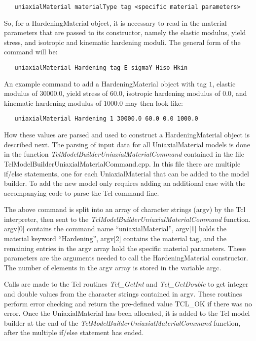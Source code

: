 \documentclass[12pt]{article}
\begin{document}
{\sf\small
\begin{verbatim}
   uniaxialMaterial materialType tag <specific material parameters>
\end{verbatim}
}

\noindent So, for a HardeningMaterial object, it is necessary to read in the material
parameters that are passed to its constructor, namely the elastic modulus, yield stress,
and isotropic and kinematic hardening moduli. The general form of the command will be:

{\sf\small
\begin{verbatim}
   uniaxialMaterial Hardening tag E sigmaY Hiso Hkin
\end{verbatim}
}

An example command to add a HardeningMaterial object with tag $1$, elastic modulus
of $30000.0$, yield stress of $60.0$, isotropic hardening modulus of $0.0$, and
kinematic hardening modulus of $1000.0$ may then look like:

{\sf\small
\begin{verbatim}
   uniaxialMaterial Hardening 1 30000.0 60.0 0.0 1000.0
\end{verbatim}
}

How these values are parsed and used to construct a HardeningMaterial object is
described next. The parsing of input data for all UniaxialMaterial models is done
in the function {\em TclModelBuilderUniaxialMaterialCommand} contained in the file
TclModelBuilderUniaxialMaterialCommand.cpp.
In this file there are multiple if/else statements, one for each UniaxialMaterial that
can be added to the model builder. To add the new model only requires adding an
additional case with the accompanying code to parse the Tcl command line.

The above command is split into an array of character strings (argv) by the Tcl
interpreter, then sent to the {\em TclModelBuilderUniaxialMaterialCommand} function.
argv[0] contains the command name ``uniaxialMaterial'', argv[1] holds the material keyword
``Hardening'', argv[2] contains the material tag, and the remaining entries in the
argv array hold the specific material parameters. These parameters are the arguments
needed to call the HardeningMaterial constructor. The number of elements in the argv
array is stored in the variable argc.

Calls are made to the Tcl routines {\em Tcl\_GetInt} and {\em Tcl\_GetDouble} to get
integer and double values from the character strings contained in argv. These routines
perform error checking and return the pre-defined value TCL\_OK if there was no error.
Once the UniaxialMaterial has been allocated, it is added to the Tcl model
builder at the end of the {\em TclModelBuilderUniaxialMaterialCommand} function, after
the multiple if/else statement has ended.
\end{document}
